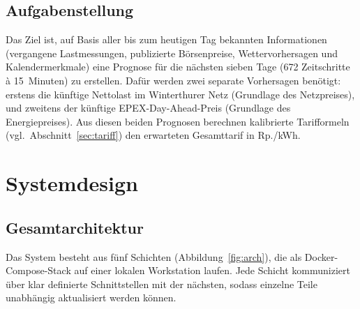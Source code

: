 \documentclass[sigconf]{acmart}
\begin{document}
\subsection{Aufgabenstellung}

Das Ziel ist, auf Basis aller bis zum heutigen Tag bekannten Informationen
(vergangene Lastmessungen, publizierte B\"orsenpreise, Wetter\-vorhersagen
und Kalendermerkmale) eine Prognose f\"ur die n\"achsten sieben Tage
(672 Zeitschritte \`a 15~Minuten) zu erstellen.
Daf\"ur werden zwei separate Vorhersagen ben\"otigt:
erstens die k\"unftige Nettolast im Winterthurer Netz (Grundlage des Netzpreises),
und zweitens der k\"unftige EPEX-Day-Ahead-Preis (Grundlage des Energiepreises).
Aus diesen beiden Prognosen berechnen kalibrierte Tarifformeln
(vgl.\ Abschnitt~\ref{sec:tariff}) den erwarteten Gesamttarif in Rp./kWh.

\section{Systemdesign}

\subsection{Gesamtarchitektur}
\label{sec:architecture}

Das System besteht aus f\"unf Schichten
(Abbildung~\ref{fig:arch}), die als Docker-Compose-Stack auf einer lokalen
Workstation laufen.
Jede Schicht kommuniziert \"uber klar definierte Schnittstellen mit der
n\"achsten, sodass einzelne Teile unabh\"angig aktualisiert werden k\"onnen.
\end{document}
